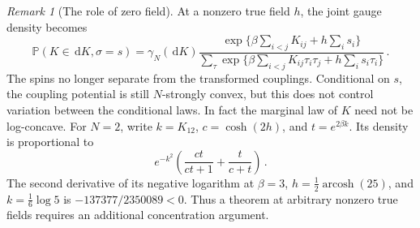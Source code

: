 \documentclass[11pt]{amsart}
\numberwithin{equation}{section}
\theoremstyle{remark}
\newtheorem{remark}[theorem]{Remark}
\newcommand{\Pp}{\mathbb P}
\newcommand{\dd}{\,\mathrm d}
\begin{document}
\begin{remark}[The role of zero field]\label{rem:nonzero-field}
At a nonzero true field $h$, the joint gauge density becomes
\begin{equation*}
 \Pp(K\in\dd K,\sigma=s)
 =\gamma_N(\dd K)
 \frac{\exp\{\beta\sum_{i<j}K_{ij}+h\sum_i s_i\}}
 {\displaystyle\sum_{\tau}\exp\{\beta\sum_{i<j}K_{ij}\tau_i\tau_j+h\sum_i s_i\tau_i\}}\,.
\end{equation*}
The spins no longer separate from the transformed couplings. Conditional on $s$, the coupling potential is still $N$-strongly convex, but this does not control variation between the conditional laws. In fact the marginal law of $K$ need not be log-concave. For $N=2$, write $k=K_{12}$, $c=\cosh(2h)$, and $t=e^{2\beta k}$. Its density is proportional to
\begin{equation*}
 e^{-k^2}\left(\frac{ct}{ct+1}+\frac{t}{c+t}\right)\,.
\end{equation*}
The second derivative of its negative logarithm at $\beta=3$, $h=\tfrac12\operatorname{arcosh}(25)$, and $k=\tfrac16\log5$ is $-137377/2350089<0$. Thus a theorem at arbitrary nonzero true fields requires an additional concentration argument.
\end{remark}
\end{document}
